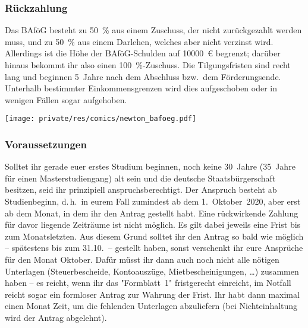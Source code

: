 \begin{multicols*}{2}
\subsubsection{Rückzahlung}
Das BAföG besteht zu \SI{50}{\percent} aus einem Zuschuss, der nicht zurückgezahlt werden muss, und zu \SI{50}{\percent} aus einem Darlehen, welches aber nicht verzinst wird.
Allerdings ist die Höhe der BAföG-Schulden auf \SI{10000}{\euro} begrenzt; darüber hinaus bekommt ihr also einen \SI{100}{\percent}-Zuschuss.
Die Tilgungsfristen sind recht lang und beginnen 5~Jahre nach dem Abschluss bzw.\ dem Förderungsende.
Unterhalb bestimmter Einkommensgrenzen wird dies aufgeschoben oder in wenigen Fällen sogar aufgehoben.

\begin{center}
	\texttt{[image: private/res/comics/newton\_bafoeg.pdf]}
\end{center}

\subsubsection{Voraussetzungen}
Solltet ihr gerade euer erstes Studium beginnen, noch keine 30~Jahre (35~Jahre für einen Masterstudiengang) alt sein und die deutsche Staatsbürgerschaft besitzen, seid ihr prinzipiell anspruchsberechtigt.
Der Anspruch besteht ab Studienbeginn, d.\,h.\ in eurem Fall zumindest ab dem 1.~Oktober~2020, aber erst ab dem Monat, in dem ihr den Antrag gestellt habt.
Eine rückwirkende Zahlung für davor liegende Zeiträume ist nicht möglich.
Es gilt dabei jeweils eine Frist bis zum Monatsletzten.
Aus diesem Grund solltet ihr den Antrag so bald wie möglich -- spätestens bis zum 31.10.\ -- gestellt haben, sonst verschenkt ihr eure Ansprüche für den Monat Oktober.
Dafür müsst ihr dann auch noch nicht alle nötigen Unterlagen (Steuerbescheide, Kontoauszüge, Mietbescheinigungen, \dots) zusammen haben -- es reicht, wenn ihr das "Formblatt~1" fristgerecht einreicht, im Notfall reicht sogar ein formloser Antrag zur Wahrung der Frist.
Ihr habt dann maximal einen Monat Zeit, um die fehlenden Unterlagen abzuliefern (bei Nichteinhaltung wird der Antrag abgelehnt).


\end{multicols*}
